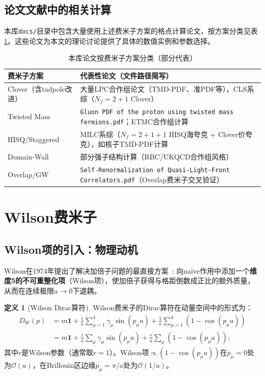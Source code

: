 \documentclass[12pt,a4paper]{ctexart}
\theoremstyle{definition}
\newtheorem{definition}{定义}[section]
\begin{document}
\subsection{论文文献中的相关计算}

本库\texttt{docs/}目录中包含大量使用上述费米子方案的格点计算论文，按方案分类见表\ref{tab:fermion_papers}。这些论文为本文的理论讨论提供了具体的数值实例和参数选择。

\begin{table}[H]
\centering
\caption{本库论文按费米子方案分类（部分代表）}
\label{tab:fermion_papers}
\small
\begin{tabular}{ll}
\toprule
费米子方案 & 代表性论文（文件路径简写） \\
\midrule
Clover（含tadpole改进） & 大量LPC合作组论文（TMD-PDF、准PDF等），CLS系综（$N_f=2+1$ Clover） \\
Twisted Mass & \texttt{Gluon PDF of the proton using twisted mass fermions.pdf}；ETMC合作组计算 \\
HISQ/Staggered & MILC系综（$N_f=2+1+1$ HISQ海夸克 + Clover价夸克），如核子TMD-PDF计算 \\
Domain-Wall & 部分强子结构计算（RBC/UKQCD合作组风格） \\
Overlap/GW & \texttt{Self-Renormalization of Quasi-Light-Front Correlators.pdf}（Overlap费米子交叉验证） \\
\bottomrule
\end{tabular}
\end{table}

\section{Wilson费米子}

\subsection{Wilson项的引入：物理动机}

Wilson在1974年提出了解决加倍子问题的最直接方案~\cite{Wilson1974}: 向na\"ive作用中添加一个\textbf{维度5的不可重整化项}（Wilson项），使加倍子获得与格距倒数成正比的额外质量，从而在连续极限$a\to 0$下退耦。

\begin{definition}[Wilson Dirac算符]
Wilson费米子的Dirac算符在动量空间中的形式为：
\begin{equation}
\begin{aligned}
D_W(p) &= m\mathbf{1} + \frac{i}{a}\sum_{\mu=1}^4 \gamma_\mu \sin(p_\mu a) + \frac{1}{a}\sum_{\mu=1}^4 (1 - \cos(p_\mu a)) \\
&= m\mathbf{1} + \frac{i}{a}\sum_\mu \gamma_\mu \sin(p_\mu a) + \frac{r}{a}\sum_\mu (1 - \cos(p_\mu a)),
\label{eq:wilson_momentum}
\end{aligned}
\end{equation}
其中$r$是Wilson参数（通常取$r=1$）。Wilson项$\propto (1-\cos(p_\mu a))$在$p_\mu=0$处为$\mathcal{O}(a)$，在Brillouin区边缘$p_\mu=\pi/a$处为$\mathcal{O}(1/a)$。
\end{definition}
\end{document}
